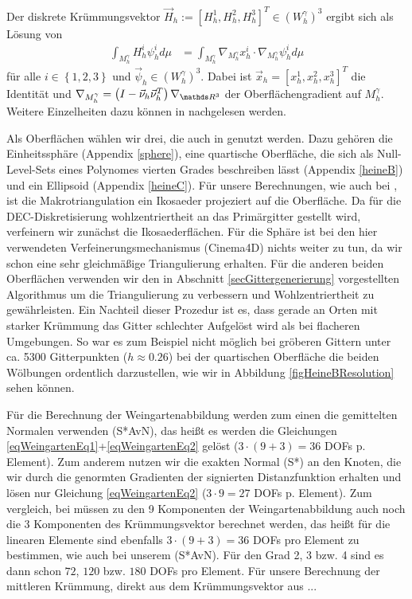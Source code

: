   Der diskrete Krümmungsvektor \( \vec{H}_{h} := \left[ H_{h}^{1}, H_{h}^{2}, H_{h}^{3} \right]^{T} \in\left( W_{h}^{\gamma} \right)^{3} \) ergibt sich als Lösung von
  \begin{align}
    \int_{M_{h}^{\gamma}} H_{h}^{i} \psi_{h}^{i} d\mu
      &=  \int_{M_{h}^{\gamma}} \nabla_{M_{h}^{\gamma}} x_{h}^{i} \cdot \nabla_{M_{h}^{\gamma}}\psi_{h}^{i} d\mu
  \end{align}
  für alle \( i\in\left\{ 1,2,3 \right\} \) und \( \vec{\psi}_{h}\in \left( W_{h}^{\gamma} \right)^{3} \).
  Dabei ist \( \vec{x}_{h} = \left[ x_{h}^{1}, x_{h}^{2}, x_{h}^{3}\right]^{T} \) die Identität 
  und \(\nabla_{M_{h}^{\gamma}} = \left( I - \vec{\nu}_{h} \vec{\nu}^{T}_{h} \right)\nabla_{\R^{3}} \) der Oberflächengradient auf \( M_{h}^{\gamma} \). 
  Weitere Einzelheiten dazu können in \cite{heine} nachgelesen werden.
  
  Als Oberflächen wählen wir drei, die auch in \cite{heine} genutzt werden. 
  Dazu gehören die Einheitssphäre (Appendix \ref{sphere}), eine quartische Oberfläche, die sich als Null-Level-Sets eines Polynomes vierten
  Grades beschreiben lässt (Appendix \ref{heineB}) und ein Ellipsoid (Appendix \ref{heineC}).
  Für unsere Berechnungen, wie auch bei \cite{heine}, ist die Makrotriangulation ein Ikosaeder projeziert auf die Oberfläche.
  Da für die DEC-Diskretisierung wohlzentriertheit an das Primärgitter gestellt wird, verfeinern wir zunächst die Ikosaederflächen.
  Für die Sphäre ist bei den hier verwendeten Verfeinerungsmechanismus (Cinema4D) nichts weiter zu tun, da wir schon eine sehr gleichmäßige
  Triangulierung erhalten.
  Für die anderen beiden Oberflächen verwenden wir den in Abschnitt \ref{secGittergenerierung} vorgestellten Algorithmus um die
  Triangulierung zu verbessern und Wohlzentriertheit zu gewährleisten.
  Ein Nachteil dieser Prozedur ist es, dass gerade an Orten mit starker Krümmung das Gitter schlechter Aufgelöst wird als bei flacheren
  Umgebungen. 
  So war es zum Beispiel nicht möglich bei gröberen Gittern unter ca. 5300 Gitterpunkten (\( h\approx 0.26 \)) bei der quartischen
  Oberfläche die beiden Wölbungen ordentlich darzustellen, wie wir in Abbildung \ref{figHeineBResolution} sehen können.

  Für die Berechnung der Weingartenabbildung werden zum einen die gemittelten Normalen verwenden (S*AvN), das heißt es werden die
  Gleichungen \eqref{eqWeingartenEq1}+\eqref{eqWeingartenEq2} gelöst (\( 3 \cdot (9+3) = 36 \) DOFs p. Element).
  Zum anderem nutzen wir die exakten Normal (S*) an den Knoten, die wir durch die genormten Gradienten der signierten Distanzfunktion erhalten
  und lösen nur Gleichung \eqref{eqWeingartenEq2} (\( 3 \cdot 9 = 27 \) DOFs p. Element).
  Zum vergleich, bei \cite{heine} müssen zu den 9 Komponenten der Weingartenabbildung auch noch die 3 Komponenten des Krümmungsvektor
  berechnet werden, das heißt für die linearen Elemente sind ebenfalls \( 3 \cdot (9+3) = 36 \) DOFs pro Element zu bestimmen, wie auch bei
  unserem (S*AvN). Für den Grad 2, 3 bzw. 4 sind es dann schon \( 72 \), \( 120 \) bzw. \( 180 \) DOFs pro Element.
  Für unsere Berechnung der mittleren Krümmung, direkt aus dem Krümmungsvektor aus ...


